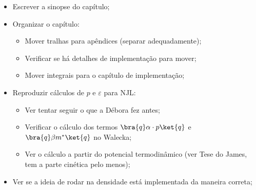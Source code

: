 \begin{itemize}
	\item Escrever a sinopse do capítulo;
	\item Organizar o capítulo:
		\begin{itemize}
			\item Mover tralhas para apêndices (separar adequadamente);
			\item Verificar se há detalhes de implementação para mover;
			\item Mover integrais para o capítulo de implementação;
		\end{itemize}
	\item Reproduzir cálculos de $p$ e $\varepsilon$ para NJL:
		\begin{itemize}
			\item Ver tentar seguir o que a Débora fez antes;
			\item Verificar o cálculo dos termos $\bra{q}\alpha\cdot p\ket{q}$ e $\bra{q}\beta m^*\ket{q}$ no Walecka;
			\item Ver o cálculo a partir do potencial termodinâmico (ver Tese do James, tem a parte cinética pelo menos);
		\end{itemize}
	\item Ver se a ideia de rodar na densidade está implementada da maneira correta;
\end{itemize}
